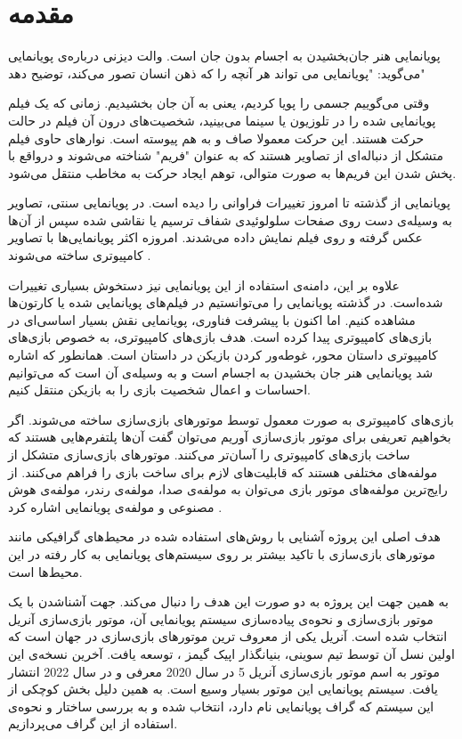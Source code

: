 \chapter{مقدمه}


پویانمایی هنر جان‌بخشیدن به اجسام بدون جان است.
والت دیزنی درباره‌‌ی پویانمایی می‌گوید: "پویانمایی می تواند هر آنچه را که ذهن انسان تصور می‌کند، توضیح دهد"

وقتی می‌گوییم جسمی را پویا کردیم، یعنی به آن جان بخشیدیم.
زمانی که یک فیلم پویانمایی شده را در تلوزیون یا سینما می‌بینید، شخصیت‌های درون آن فیلم در حالت حرکت هستند.
این حرکت معمولا صاف و به هم پیوسته است. نوارهای حاوی فیلم متشکل از دنباله‌ای از تصاویر هستند که به عنوان "فریم" شناخته می‌شوند و درواقع با پخش شدن این فریم‌ها
به صورت متوالی، توهم ایجاد حرکت به مخاطب منتقل می‌شود.

پویانمایی از گذشته تا امروز تغییرات فراوانی را دیده است.
در پویانمایی سنتی، تصاویر به وسیله‌‌ی دست روی صفحات سلولوئیدی شفاف ترسیم یا نقاشی شده 
سپس از آن‌ها عکس گرفته و روی فیلم نمایش داده می‌شدند.
امروزه اکثر پویانمایی‌ها با تصاویر کامپیوتری
ساخته می‌شوند \cite{AnimationWikipedia}.

علاوه بر این، دامنه‌ی استفاده از این پویانمایی نیز دستخوش بسیاری تغییرات شده‌است.
در گذشته پویانمایی را می‌توانستیم در فیلم‌های پویانمایی شده یا کارتون‌ها مشاهده کنیم.
اما اکنون با پیشرفت فناوری، پویانمایی نقش بسیار اساسی‌ای در بازی‌های کامپیوتری پیدا کرده است.
هدف بازی‌‌های کامپیوتری، به خصوص بازی‌های کامپیوتری داستان محور، غوطه‌ور کردن بازیکن 
در داستان است.
همانطور که اشاره شد پویانمایی هنر جان بخشیدن به اجسام است و به وسیله‌ی 
آن است که می‌توانیم احساسات و اعمال شخصیت بازی را به بازیکن منتقل کنیم.

بازی‌های کامپیوتری به صورت معمول توسط موتور‌های بازی‌سازی ساخته می‌شوند.
اگر بخواهیم تعریفی برای موتور بازی‌سازی آوریم می‌توان گفت 
آن‌ها پلتفرم‌هایی هستند که ساخت بازی‌های کامپیوتری را آسان‌تر می‌کنند.
موتور‌های بازی‌سازی متشکل از مولفه‌های مختلفی هستند که قابلیت‌های لازم برای ساخت بازی را فراهم می‌کنند.
از رایج‌ترین مولفه‌های موتور بازی می‌توان به مولفه‌ی صدا، مولفه‌ی رندر، مولفه‌ی هوش مصنوعی و مولفه‌ی پویانمایی اشاره کرد \cite{barczak2019comparative}.

هدف اصلی این پروژه آشنایی با روش‌های استفاده شده در محیط‌های گرافیکی مانند موتورهای بازی‌سازی با تاکید بیشتر بر 
روی سیستم‌های پویانمایی به کار رفته در این محیط‌ها است.

به همین جهت این پروژه به دو صورت این هدف را دنبال می‌کند.
جهت آشناشدن با یک موتور بازی‌سازی و نحوه‌ی پیاده‌سازی سیستم پویانمایی آن، موتور 
بازی‌سازی آنریل انتخاب شده است.
آنریل یکی از معروف ترین موتور‌های بازی‌سازی در جهان است که اولین نسل آن
توسط تیم سوینی، بنیانگذار اپیک گیمز 
، توسعه یافت.
آخرین نسخه‌ی این موتور به اسم موتور بازی‌سازی آنریل 5 
در سال 2020 معرفی و در سال 2022 انتشار یافت.
سیستم پویانمایی این موتور بسیار وسیع است. به همین دلیل بخش کوچکی از این سیستم که گراف پویانمایی نام دارد، انتخاب شده و
 به بررسی ساختار و نحوه‌ی استفاده از این گراف می‌پردازیم.


